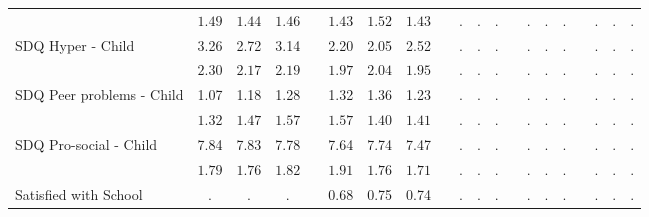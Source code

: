 \begin{landscape}
\begin{center}
{\begin{longtable}{L{5cm} c c c p{.5cm} c c c p{.5cm} c c c p{.5cm} c c c p{.5cm} c c c}
& $\mathit{     1.49}$ & $\mathit{     1.44}$ & $\mathit{     1.46}$ & & $\mathit{     1.43}$ & $\mathit{     1.52}$ & $\mathit{     1.43}$ & & $\mathit{        .}$ & $\mathit{        .}$ & $\mathit{        .}$ & & $\mathit{        .}$ & $\mathit{        .}$ & $\mathit{        .}$ & & $\mathit{        .}$ & $\mathit{        .}$ & $\mathit{        .}$ \\[1.6em]
SDQ Hyper - Child & 3.26 &      2.72 &      3.14 & &      2.20 &      2.05 &      2.52 & &         . &         . &         . & &         . &         . &         . & &         . &         . &         . \\*
& $\mathit{     2.30}$ & $\mathit{     2.17}$ & $\mathit{     2.19}$ & & $\mathit{     1.97}$ & $\mathit{     2.04}$ & $\mathit{     1.95}$ & & $\mathit{        .}$ & $\mathit{        .}$ & $\mathit{        .}$ & & $\mathit{        .}$ & $\mathit{        .}$ & $\mathit{        .}$ & & $\mathit{        .}$ & $\mathit{        .}$ & $\mathit{        .}$ \\[1.6em]
SDQ Peer problems - Child & 1.07 &      1.18 &      1.28 & &      1.32 &      1.36 &      1.23 & &         . &         . &         . & &         . &         . &         . & &         . &         . &         . \\*
& $\mathit{     1.32}$ & $\mathit{     1.47}$ & $\mathit{     1.57}$ & & $\mathit{     1.57}$ & $\mathit{     1.40}$ & $\mathit{     1.41}$ & & $\mathit{        .}$ & $\mathit{        .}$ & $\mathit{        .}$ & & $\mathit{        .}$ & $\mathit{        .}$ & $\mathit{        .}$ & & $\mathit{        .}$ & $\mathit{        .}$ & $\mathit{        .}$ \\[1.6em]
SDQ Pro-social - Child & 7.84 &      7.83 &      7.78 & &      7.64 &      7.74 &      7.47 & &         . &         . &         . & &         . &         . &         . & &         . &         . &         . \\*
& $\mathit{     1.79}$ & $\mathit{     1.76}$ & $\mathit{     1.82}$ & & $\mathit{     1.91}$ & $\mathit{     1.76}$ & $\mathit{     1.71}$ & & $\mathit{        .}$ & $\mathit{        .}$ & $\mathit{        .}$ & & $\mathit{        .}$ & $\mathit{        .}$ & $\mathit{        .}$ & & $\mathit{        .}$ & $\mathit{        .}$ & $\mathit{        .}$ \\[1.6em]
Satisfied with School & . &         . &         . & &      0.68 &      0.75 &      0.74 & &         . &         . &         . & &         . &         . &         . & &         . &         . &         . \\*

\end{longtable}}
\end{center}
\end{landscape}
